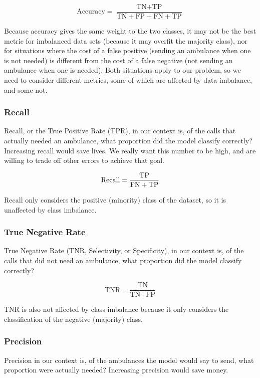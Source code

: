 $$\text{Accuracy} = \frac{ \text{TN} + \text{TP}}{\text{TN} + \text{FP} + \text{FN} + \text{TP}}$$

Because accuracy gives the same weight to the two classes, it may not be the best metric for imbalanced data sets (because it may overfit the majority class), nor for situations where the cost of a false positive (sending an ambulance when one is not needed) is different from the cost of a false negative (not sending an ambulance when one is needed).  Both situations apply to our problem, so we need to consider different metrics, some of which are affected by data imbalance, and some not.

\subsubsection{Recall}

Recall, or the True Positive Rate (TPR), in our context is, of the calls that actually needed an ambulance, what proportion did the model classify correctly?  
Increasing recall would save lives.  
We really want this number to be high, and are willing to trade off other errors to achieve that goal.  

$$\text{Recall} = \frac{ 
	\text{TP}
	}{
	\text{FN} 
	+ 
	\text{TP}
}$$

Recall only considers the positive (minority) class of the dataset, so it is unaffected by class imbalance.  

\subsubsection{True Negative Rate}

True Negative Rate (TNR, Selectivity, or Specificity), in our context is, of the calls that did not need an ambulance, what proportion did the model classify correctly?  

$$\text{TNR} = \frac{ 
	\text{TN} 
	}{
	\text{TN} 
	+ 
	\text{FP} 
}$$

TNR is also not affected by class imbalance because it only considers the classification of the negative (majority) class.  

\subsubsection{Precision}

Precision in our context is, of the ambulances the model would say to send, what proportion were actually needed?  Increasing precision would save money.  

